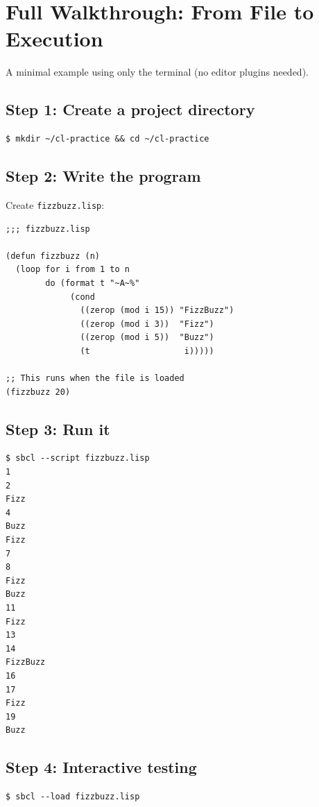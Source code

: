 \documentclass[a4paper,11pt]{article}
\newcommand{\file}[1]{\texttt{#1}}
\begin{document}
\section{Full Walkthrough: From File to Execution}

A minimal example using only the terminal (no editor plugins needed).

\subsection{Step 1: Create a project directory}

\begin{lstlisting}[style=shell]
$ mkdir ~/cl-practice && cd ~/cl-practice
\end{lstlisting}

\subsection{Step 2: Write the program}

Create \file{fizzbuzz.lisp}:

\begin{lstlisting}
;;; fizzbuzz.lisp

(defun fizzbuzz (n)
  (loop for i from 1 to n
        do (format t "~A~%"
             (cond
               ((zerop (mod i 15)) "FizzBuzz")
               ((zerop (mod i 3))  "Fizz")
               ((zerop (mod i 5))  "Buzz")
               (t                   i)))))

;; This runs when the file is loaded
(fizzbuzz 20)
\end{lstlisting}

\subsection{Step 3: Run it}

\begin{lstlisting}[style=shell]
$ sbcl --script fizzbuzz.lisp
1
2
Fizz
4
Buzz
Fizz
7
8
Fizz
Buzz
11
Fizz
13
14
FizzBuzz
16
17
Fizz
19
Buzz
\end{lstlisting}

\subsection{Step 4: Interactive testing}

\begin{lstlisting}[style=shell]
$ sbcl --load fizzbuzz.lisp
\end{lstlisting}
\end{document}
